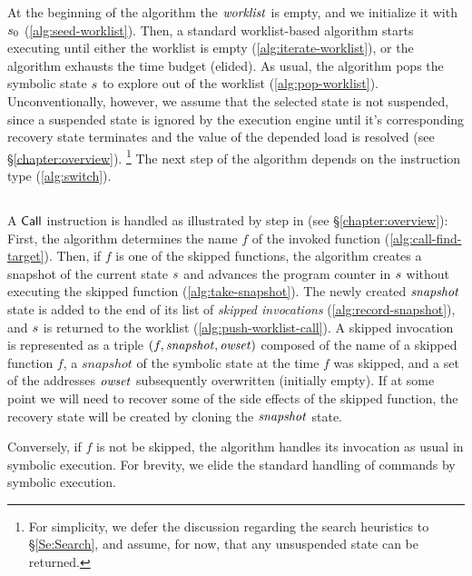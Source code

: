 At the beginning of the algorithm the $\mathit{worklist}$ is empty, and we
initialize it with $s_0$ (\cref{alg:seed-worklist}). Then, a
standard worklist-based algorithm starts executing until either the
worklist is empty (\cref{alg:iterate-worklist}), or the algorithm
exhausts the time budget (elided). As usual, the algorithm pops the
symbolic state $s$ to explore out of the worklist
(\cref{alg:pop-worklist}). Unconventionally, however, we assume that
the selected state is not suspended, since a suspended state is ignored by the execution engine
until it's corresponding recovery state terminates
and the value of the depended load is resolved (see \S\ref{chapter:overview}).
\footnote{For simplicity, we defer the
discussion regarding the search heuristics to \S\ref{Se:Search}, and
assume, for now, that any unsuspended state can be returned.}  The
next step of the algorithm depends on the instruction type
(\cref{alg:switch}).

\subsection{}

A $\mathsf{Call}$ instruction is handled as illustrated by step
 in  (see \S\ref{chapter:overview}): First, the
algorithm determines the name $f$ of the invoked function
(\cref{alg:call-find-target}). Then, if $f$ is one of the skipped
functions, the algorithm creates a snapshot of the current state
$s$ and advances the program counter in $s$
without executing the skipped function (\cref{alg:take-snapshot}).
The newly created $\mathit{snapshot}$ state is added to the end of its list 
of \emph{skipped invocations} (\cref{alg:record-snapshot}),
and $s$ is returned to the worklist
(\cref{alg:push-worklist-call}).
A skipped invocation is represented
as a triple $(f,\mathit{snapshot},\mathit{owset})$ composed of the name of a skipped
function $f$, a $snapshot$ of the symbolic state at the time $f$ was
skipped, and a set of the addresses $\mathit{owset}$ subsequently overwritten
(initially empty).
If at some point we will need to recover some of the side effects
of the skipped function, the recovery state will be created
by cloning the $\mathit{snapshot}$ state.

Conversely, if $f$ is not be skipped, the algorithm handles its
invocation as usual in symbolic execution.  For brevity, we elide the
standard handling of commands by symbolic execution.


